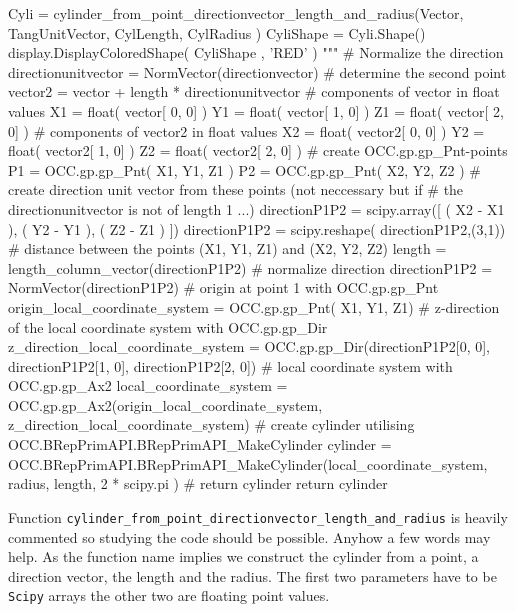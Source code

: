 \begin{python}[moreemph={[4], 46, 48},caption={Step3\_2.py - Defining a cylinder from a point, a direction vector, the length and the radius},label=LISTING_STEP3_2_PY_A]
        Cyli = cylinder_from_point_directionvector_length_and_radius(Vector, 
                                                             TangUnitVector,
                                                             CylLength,
                                                             CylRadius ) 
        CyliShape = Cyli.Shape()
        display.DisplayColoredShape( CyliShape , 'RED' ) 
    """
    # Normalize the direction
    directionunitvector = NormVector(directionvector)
    # determine the second point
    vector2 = vector + length * directionunitvector    
    # components of vector in float values
    X1 = float( vector[ 0, 0] )
    Y1 = float( vector[ 1, 0] )
    Z1 = float( vector[ 2, 0] )
    # components of vector2 in float values
    X2 = float( vector2[ 0, 0] )
    Y2 = float( vector2[ 1, 0] )
    Z2 = float( vector2[ 2, 0] )
    # create OCC.gp.gp_Pnt-points
    P1 = OCC.gp.gp_Pnt( X1, Y1, Z1 )
    P2 = OCC.gp.gp_Pnt( X2, Y2, Z2 )
    # create direction unit vector from these points (not neccessary but if 
    # the directionunitvector is not of length 1 ...)
    directionP1P2 = scipy.array([   ( X2 - X1 ),
                                    ( Y2 - Y1 ),  
                                    ( Z2 - Z1 ) ])
    directionP1P2 = scipy.reshape( directionP1P2,(3,1))
    # distance between the points (X1, Y1, Z1) and (X2, Y2, Z2)
    length = length_column_vector(directionP1P2)
    # normalize direction
    directionP1P2 = NormVector(directionP1P2)                                                
    # origin at point 1 with OCC.gp.gp_Pnt
    origin_local_coordinate_system = OCC.gp.gp_Pnt( X1, Y1, Z1)
    # z-direction of the local coordinate system with OCC.gp.gp_Dir
    z_direction_local_coordinate_system = OCC.gp.gp_Dir(directionP1P2[0, 0], 
                                                        directionP1P2[1, 0], 
                                                        directionP1P2[2, 0])
    # local coordinate system with OCC.gp.gp_Ax2
    local_coordinate_system = OCC.gp.gp_Ax2(origin_local_coordinate_system, 
                                            z_direction_local_coordinate_system)
    # create cylinder utilising OCC.BRepPrimAPI.BRepPrimAPI_MakeCylinder
    cylinder = OCC.BRepPrimAPI.BRepPrimAPI_MakeCylinder(local_coordinate_system, 
                                                        radius, 
                                                        length, 
                                                        2 * scipy.pi )
    # return cylinder
    return cylinder
\end{python}
Function {\tt cylinder\_from\_point\_directionvector\_length\_and\_radius} is heavily commented so studying the code should be possible.
Anyhow a few words may help.
As the function name implies we construct the cylinder from a point, a direction vector, the length and the radius.
The first two parameters have to be {\tt Scipy} arrays the other two are floating point values.

